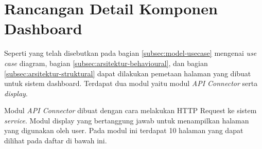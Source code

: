 \section{Rancangan Detail Komponen Dashboard}
\label{sec:rancangan-dashboard}

Seperti yang telah disebutkan pada bagian \ref{subsec:model-usecase} mengenai \textit{use case} diagram, bagian \ref{subsec:arsitektur-behavioural}, dan bagian \ref{subsec:arsitektur-struktural} dapat dilakukan pemetaan halaman yang dibuat untuk sistem dashboard. Terdapat dua modul yaitu modul \textit{API Connector} serta \textit{display}.

Modul \textit{API Connector} dibuat dengan cara melakukan HTTP Request ke sistem \textit{service}. Modul display yang bertanggung jawab untuk menampilkan halaman yang digunakan oleh user. Pada modul ini terdapat 10 halaman yang dapat dilihat pada daftar di bawah ini.

